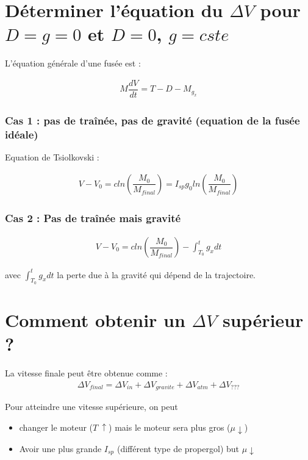 \documentclass{report}
\begin{document}
\section{Déterminer l'équation du $\Delta V$ pour $D=g=0$ et $D=0$, $g = cste$}

L'équation générale d'une fusée est :

\begin{eqnarray}
\boxed{M\dfrac{dV}{dt}=T-D-M_{g_x}}
\end{eqnarray}

\subsubsection{Cas 1 : pas de traînée, pas de gravité (equation de la fusée idéale)}

Equation de Tsiolkovski :

\begin{eqnarray}
\boxed{V-V_0=c ln\left(\dfrac{M_0}{M_{final}}\right)=I_{sp} g_0 ln\left(\dfrac{M_0}{M_{final}}\right)}
\end{eqnarray}

\subsubsection{Cas 2 : Pas de traînée mais gravité}

\begin{eqnarray}
\boxed{V-V_0=c ln\left(\dfrac{M_0}{M_{final}}\right) - \int_{T_0}^{t}g_x dt}
\end{eqnarray}

avec $\int_{T_0}^{t}g_x dt$ la perte due à la gravité qui dépend de la trajectoire.

\section{Comment obtenir un $\Delta V$ supérieur ?}

La vitesse finale peut être obtenue comme :
\begin{eqnarray}
\Delta V_{final} = \Delta V_{in}+\Delta V_{gravite} +\Delta V_{atm}+\Delta V_{???}
\end{eqnarray}

Pour atteindre une vitesse supérieure, on peut 
\begin{itemize}
    \item changer le moteur ($T~\uparrow$) mais le moteur sera plus gros ($\mu \downarrow$)
    \item Avoir une plus grande $I_{sp}$ (différent type de propergol) but $\mu \downarrow$
\end{itemize}
\end{document}

